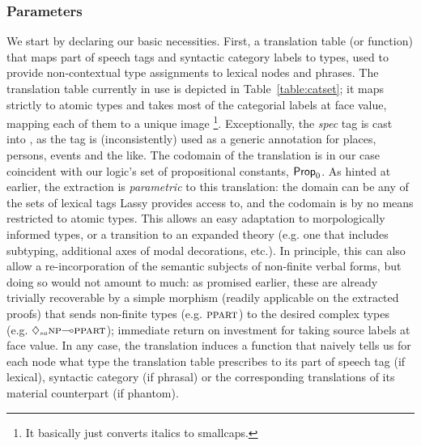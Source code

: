 \subsubsection{Parameters}
We start by declaring our basic necessities.
First, a translation table (or function) that maps part of speech tags and syntactic category labels to types, used to provide non-contextual type assignments to lexical nodes and phrases.
The translation table currently in use is depicted in Table~\ref{table:catset}; it maps strictly to atomic types and takes most of the categorial labels at face value, mapping each of them to a unique image%
\footnote{It basically just converts italics to smallcaps.}.
Exceptionally, the \textit{spec} tag is cast into , as the tag is (inconsistently) used as a generic annotation for places, persons, events and the like.
The codomain of the translation is in our case coincident with our logic's set of propositional constants, $\mathsf{Prop}_0$.
As hinted at earlier, the extraction is \textit{parametric} to this translation: the domain can be any of the sets of lexical tags Lassy provides access to, and the codomain is by no means restricted to atomic types.
This allows an easy adaptation to morpologically informed types, or a transition to an expanded theory (e.g. one that includes subtyping, additional axes of modal decorations, etc.). 
In principle, this can also allow a re-incorporation of the semantic subjects of non-finite verbal forms, but doing so would not amount to much: as promised earlier, these are already trivially recoverable by a simple morphism (readily applicable on the extracted proofs) that sends non-finite types (e.g. $\ppart[s]$) to the desired complex types (e.g. $\ddia{su}\np[s]\li\ppart[s]$); immediate return on investment for taking source labels at face value.
In any case, the translation induces a function that naively tells us for each node what type the translation table prescribes to its part of speech tag (if lexical), syntactic category (if phrasal) or the corresponding translations of its material counterpart (if phantom).

